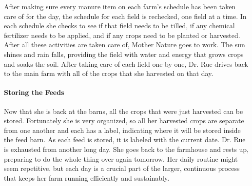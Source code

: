 \documentclass{article}
\begin{document}
After making sure every manure item on each farm’s schedule has been taken care of for the day, the schedule for each field is rechecked, one field at a time. In each schedule she checks to see if that field needs to be tilled, if any chemical fertilizer needs to be applied, and if any crops need to be planted or harvested. After all these activities are taken care of, Mother Nature goes to work. The sun shines and rain falls, providing the field with water and energy that grows crops and soaks the soil. After taking care of each field one by one, Dr. Rue drives back to the main farm with all of the crops that she harvested on that day.

\paragraph{Storing the Feeds}
Now that she is back at the barns, all the crops that were just harvested can be stored. Fortunately she is very organized, so all her harvested crops are separate from one another and each has a label, indicating where it will be stored inside the feed barn. As each feed is stored, it is labeled with the current date. Dr. Rue is exhausted from another long day. She goes back to the farmhouse and rests up, preparing to do the whole thing over again tomorrow. Her daily routine might seem repetitive, but each day is a crucial part of the larger, continuous process that keeps her farm running efficiently and sustainably.
\end{document}
